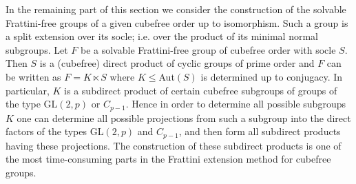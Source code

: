 In the remaining part of this section we consider the construction of the
solvable Frattini-free groups of a given cubefree order up to
isomorphism. Such a group is a split extension over its socle; i.e. over the
product of its minimal normal subgroups. Let $F$ be a solvable Frattini-free
group of cubefree order with socle $S$. Then $S$ is a (cubefree) direct product of cyclic
groups of prime order and $F$ can be written as $F=K\ltimes S$
where $K\leq$Aut$(S)$ is determined up to conjugacy. In particular, $K$ is a subdirect product of certain
cubefree subgroups of groups of the type GL$(2,p)$ or
$C_{p-1}$. Hence in order to determine all possible subgroups $K$ one can
determine all possible projections from such a subgroup into the direct factors
of the types GL$(2,p)$ and $C_{p-1}$, and then form all subdirect
products having these projections. The construction of these subdirect
products is one of the most time-consuming parts in the Frattini extension
method for cubefree groups.
